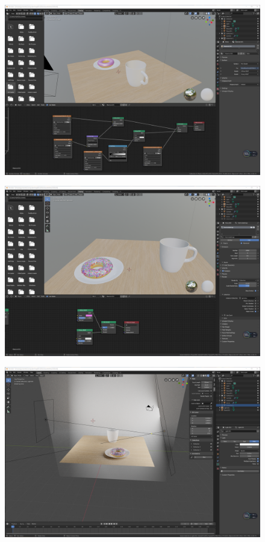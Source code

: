 \documentclass[logo,reportComp]{thesis}
\begin{document}
\begin{figure}[H]
\centering
\includegraphics[width=\linewidth]{fig/v6.png}
\end{figure}
\begin{figure}[H]
\centering
\includegraphics[width=\linewidth]{fig/v7.png}
\end{figure}
\begin{figure}[H]
\centering
\includegraphics[width=\linewidth]{fig/v8.png}
\end{figure}
\end{document}
